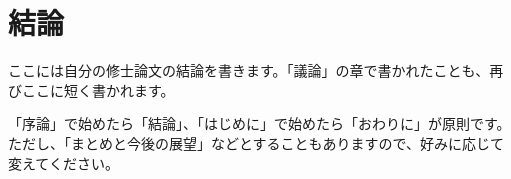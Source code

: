 \chapter{結論}
ここには自分の修士論文の結論を書きます。「議論」の章で書かれたことも、再びここに短く書かれます。

「序論」で始めたら「結論」、「はじめに」で始めたら「おわりに」が原則です。ただし、「まとめと今後の展望」などとすることもありますので、好みに応じて変えてください。
